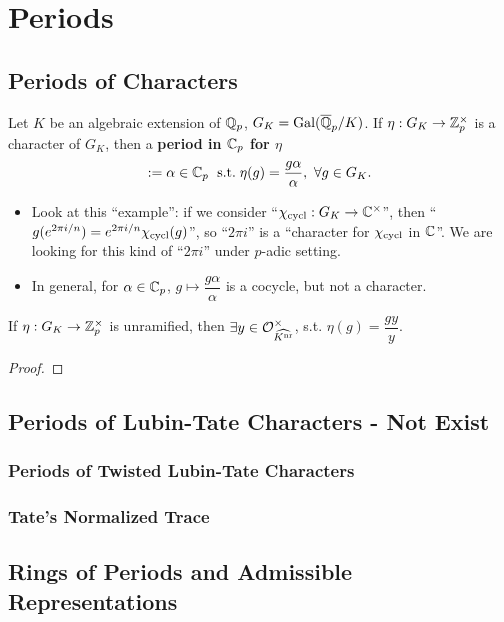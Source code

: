 \section{Periods}

\subsection{Periods of Characters}

Let $K$ be an algebraic extension of $\mathbb{Q}_p$,
$G_K = \operatorname{Gal}(\overline{\mathbb{Q}}_p/K)$.
If $\eta : G_K\to\mathbb{Z}_p^\times$ is a character of $G_K$,
then a \textbf{period in $\mathbb{C}_p$ for $\eta$} \[:= \alpha\in\mathbb{C}_p\ \;\mathrm{s.t.}\; \eta(g) = \frac{g\alpha}{\alpha},\ \forall g\in G_K.\]
\begin{remark}
    \begin{itemize}
        \item Look at this ``example'': if we consider ``$\chi_{\mathrm{cycl}} : G_K\to\mathbb{C}^\times$'',
        then ``$g(e^{2\pi i/n}) = e^{2\pi i/n}\chi_{\mathrm{cycl}}(g)$'',
        so ``$2\pi i$'' is a ``character for $\chi_{\mathrm{cycl}}$ in $\mathbb{C}$''.
        We are looking for this kind of ``$2\pi i$'' under $p$-adic setting.
        \item In general, for $\alpha\in\mathbb{C}_p$, $g\mapsto \dfrac{g\alpha}{\alpha}$ is a cocycle, but not a character.
    \end{itemize}
\end{remark}
\begin{theorem}
    If $\eta : G_K\to\mathbb{Z}_p^\times$ is unramified,
    then $\exists y\in\mathcal{O}_{\widehat{K^{\mathrm{nr}}}}^\times$, s.t. $\eta(g) = \dfrac{gy }{y}$. 
\end{theorem}
\begin{proof}
    
\end{proof}

\subsection{Periods of Lubin-Tate Characters - Not Exist}
\subsubsection{Periods of Twisted Lubin-Tate Characters}

\subsubsection{Tate's Normalized Trace}

\subsection{Rings of Periods and Admissible Representations}
